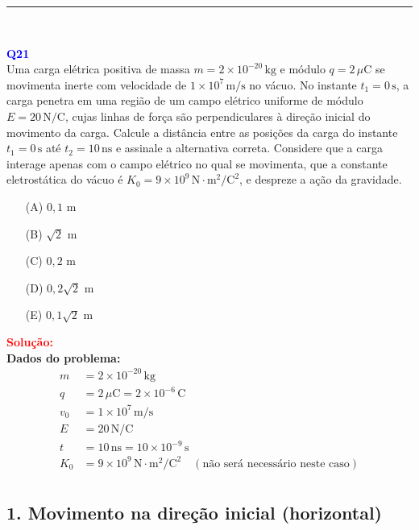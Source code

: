 \documentclass[a4paper,12pt]{article}
\begin{document}
\noindent\rule{\linewidth}{0.6pt}\\

\begin{flushleft}
\textbf{\textcolor{blue}{\Large Q21}}\\

Uma carga elétrica positiva de massa \( m = 2 \times 10^{-20} \, \text{kg} \) e módulo \( q = 2 \, \mu\text{C} \) se movimenta
inerte com velocidade de \( 1 \times 10^7 \, \text{m/s} \) no vácuo. No instante \( t_1 = 0 \, \text{s} \), a carga penetra 
em uma região de um campo elétrico uniforme de módulo \( E = 20 \, \text{N/C} \), cujas linhas de força são perpendiculares 
à direção inicial do movimento da carga. Calcule a distância entre as posições da carga do instante \( t_1 = 0 \, \text{s} \) 
até \( t_2 = 10 \, \text{ns} \) e assinale a alternativa correta. Considere que a carga interage apenas com o campo elétrico 
no qual se movimenta, que a constante eletrostática do vácuo é \( K_0 = 9 \times 10^9 \, \text{N}\cdot\text{m}^2/\text{C}^2 \), 
e despreze a ação da gravidade.

\begin{itemize}
\item[(A)] $0{,}1$ m
\item[(B)] $\sqrt{2}$ m  
\item[(C)] $0{,}2$ m
\item[(D)] $0{,}2\sqrt{2}$ m  
\item[(E)] $0{,}1\sqrt{2}$ m  
\end{itemize}

\vspace{0.5cm}

\textcolor{red}{\textbf{Solução:}}\\

\textbf{Dados do problema:}
\begin{align*}
m &= 2 \times 10^{-20} \, \text{kg} \\
q &= 2 \, \mu\text{C} = 2 \times 10^{-6} \, \text{C} \\
v_0 &= 1 \times 10^7 \, \text{m/s} \\
E &= 20 \, \text{N/C} \\
t &= 10 \, \text{ns} = 10 \times 10^{-9} \, \text{s} \\
K_0 &= 9 \times 10^9 \, \text{N} \cdot \text{m}^2/\text{C}^2 \quad (\text{não será necessário neste caso}) \\
\end{align*}

\subsection*{1. Movimento na direção inicial (horizontal)}


\end{flushleft}
\end{document}

